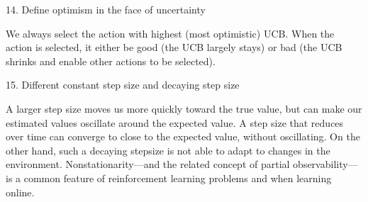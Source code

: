 \documentclass[sutton_barto_notes.tex]{subfiles}
\begin{document}
14. Define optimism in the face of uncertainty

We always select the action with highest (most optimistic) UCB. When the action is selected, it either be good (the UCB largely stays) or bad (the UCB shrinks and enable other actions to be selected).


15. Different constant step size and decaying step size

A larger step size moves us more quickly toward the true value, but can make our estimated values oscillate around the expected value. A step size that reduces over time can converge to close to the expected value, without oscillating. On the other hand, such a decaying stepsize is not able to adapt to changes in the environment. Nonstationarity---and the related concept of partial observability---is a common feature of reinforcement learning problems and when learning online.
\end{document}
